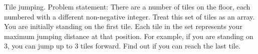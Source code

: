 \documentclass{article}
\begin{document}
    Tile jumping.
    Problem statement: There are a number of tiles on the floor, each numbered with a different non-negative integer.
    Treat this set of tiles as an array.
    You are initially standing on the first tile.
    Each tile in the set represents your maximum jumping distance at that position.
    For example, if you are standing on 3, you can jump up to 3 tiles forward.
    Find out if you can reach the last tile.
\end{document}
